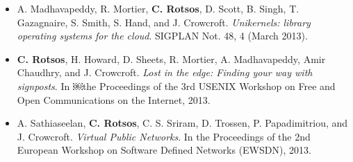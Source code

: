 \begin{itemize}
  \item A. Madhavapeddy, R. Mortier, \textbf{C. Rotsos}, D. Scott, B. Singh, T.
        Gazagnaire, S. Smith, S. Hand, and J.  Crowcroft. \textit{Unikernels: library
            operating systems for the cloud}.  SIGPLAN Not. 48, 4 (March 2013). 

  \item \textbf{C. Rotsos}, H. Howard, D. Sheets, R. Mortier, A. Madhavapeddy, Amir
        Chaudhry, and J. Crowcroft. \textit{Lost in the edge: Finding your way with
            \dnssec signposts}. In ￼the Proceedings of the 3rd USENIX
        Workshop on Free and Open Communications on the Internet, 2013.

  \item A. Sathiaseelan, \textbf{C. Rotsos}, C. S. Sriram, D. Trossen, P.
      Papadimitriou, and J. Crowcroft. \textit{Virtual Public Networks}. In the
        Proceedings of the 2nd European Workshop on  Software Defined Networks
        (EWSDN), 2013.

\end{itemize}
